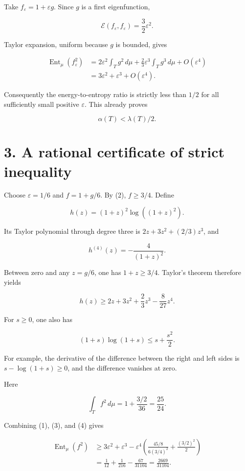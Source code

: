 \documentclass[11pt,a4paper]{article}
\begin{document}
Take \(f_\varepsilon=1+\varepsilon g\). Since \(g\) is a first
eigenfunction,

\[
\mathcal E(f_\varepsilon,f_\varepsilon)=\frac32\varepsilon^2.
\]

Taylor expansion, uniform because \(g\) is bounded, gives

\[
\begin{aligned}
\operatorname{Ent}_\mu(f_\varepsilon^2)
&=2\varepsilon^2\int_T g^2\,d\mu
 +\frac23\varepsilon^3\int_T g^3\,d\mu
 +O(\varepsilon^4)\\
&=3\varepsilon^2+\varepsilon^3+O(\varepsilon^4).
\end{aligned}
\]

Consequently the energy-to-entropy ratio is strictly less than \(1/2\)
for all sufficiently small positive \(\varepsilon\). This already proves

\[
\alpha(T)<\lambda(T)/2.
\]

\hypertarget{1019-a-rational-certificate-of-strict-inequality}{%
\section{3. A rational certificate of strict
inequality}\label{1019-a-rational-certificate-of-strict-inequality}}

Choose \(\varepsilon=1/6\) and \(f=1+g/6\). By (2), \(f\geq3/4\). Define

\[
h(z)=(1+z)^2\log((1+z)^2).
\]

Its Taylor polynomial through degree three is \(2z+3z^2+(2/3)z^3\), and

\[
h^{(4)}(z)=-\frac4{(1+z)^2}.
\]

Between zero and any \(z=g/6\), one has \(1+z\geq3/4\). Taylor's theorem
therefore yields

\[
h(z)\geq2z+3z^2+\frac23z^3-\frac8{27}z^4.
\tag{3}
\]

For \(s\geq0\), one also has

\[
(1+s)\log(1+s)\leq s+\frac{s^2}{2}.
\tag{4}
\]

For example, the derivative of the difference between the right and left
sides is \(s-\log(1+s)\geq0\), and the difference vanishes at zero.

Here

\[
\int_T f^2\,d\mu=1+\frac{3/2}{36}=\frac{25}{24}.
\]

Combining (1), (3), and (4) gives

\[
\begin{aligned}
\operatorname{Ent}_\mu(f^2)
&\geq3\varepsilon^2+\varepsilon^3
-\varepsilon^4\left(
\frac{45/8}{6(3/4)^2}+\frac{(3/2)^2}{2}\right)\\
&=\frac1{12}+\frac1{216}-\frac{67}{31104}
=\frac{2669}{31104}.
\end{aligned}
\]
\end{document}
